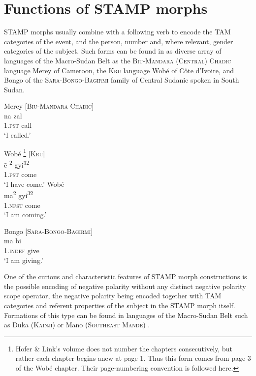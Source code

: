 \documentclass[output=paper]{langsci/langscibook}
\begin{document}
\section{Functions of STAMP morphs}\label{sec:Anderson:3}

STAMP morphs usually combine with a following verb to encode the TAM categories of the event, and the person, number and, where relevant, gender categories of the subject. Such forms can be found in as diverse array of languages of the Macro-Sudan Belt as the \textsc{Biu-Mandara (Central) Chadic} language Merey  of Cameroon, the \textsc{Kru} language Wobé  of Côte d'Ivoire, and Bongo of the \textsc{Sara-Bongo-Bagirmi} family of Central Sudanic  spoken in South Sudan.

\ea\label{ex:anderson:3}
Merey  \citep[8]{Gravina2007}                  \textsc{[Biu-Mandara Chadic]}\\
\gll na  zal    \\
\textsc{1.pst}  call   \\
\glt `I called.'  
\z


\ea\label{ex:anderson:4}
\ea\label{ex:anderson:4a}
Wobé \citep[Wobé 3]{HoferLink1973}\footnote{Hofer \& Link's volume does not number the chapters consecutively, but rather each chapter begins anew at page 1. Thus this form comes from page 3 of the Wobé chapter. Their page-numbering convention is followed here.}    \textsc{[Kru]}\\
\gll ẽ\textsuperscript{ 2}    gyi\textsuperscript{32}            \\
1.\textsc{pst}  come  \\
\glt `I have come.'            
\ex \label{ex:anderson:4b}
Wobé\\
\gll  ma\textsuperscript{2}  gyi\textsuperscript{32}\\
1.\textsc{npst}  come\\
\glt `I am coming.'  
\z
\z

\ea\label{ex:anderson:5}
Bongo   \citep[75]{TuckerBryan1966}       [\textsc{Sara-Bongo-Bagirmi}]\\
\gll ma    bi\\
1.\textsc{indef}  give  \\
\glt `I am giving.'
\z

One of the curious and characteristic features of STAMP morph constructions is the possible encoding of negative polarity without any distinct negative polarity scope operator, the negative polarity being encoded together with TAM categories and referent properties of the subject in the STAMP morph itself. Formations of this type can be found in languages of the Macro-Sudan Belt such as Duka (\textsc{Kainji})  or Mano (\textsc{Southeast Mande}) . 
\end{document}
